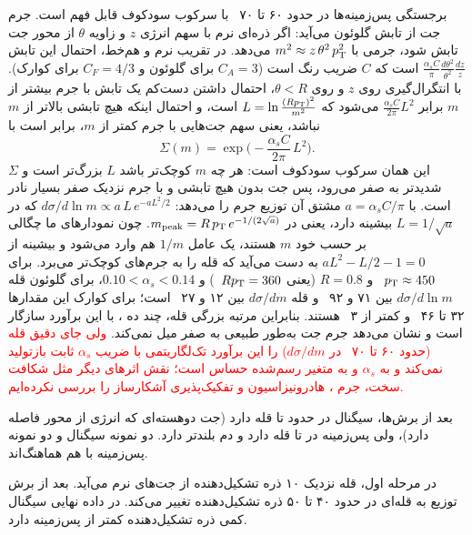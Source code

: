 برجستگی پس‌زمینه‌ها در حدود ۶۰ تا ۷۰~ با سرکوب سودکوف قابل فهم است. جرم جت از تابش گلوئون می‌آید: اگر ذره‌ای نرم با سهم انرژی $z$ و زاویه $\theta$ از محور جت تابش شود، جرمی با $m^2\approx z\,\theta^2\,p_\mathrm{T}^2$ می‌دهد. در تقریب نرم و هم‌خط، احتمال این تابش $\frac{\alpha_s C}{\pi}\frac{d\theta^2}{\theta^2}\frac{dz}{z}$ است که $C$ ضریب رنگ است ($C_A=3$ برای گلوئون و $C_F=4/3$ برای کوارک). با انتگرال‌گیری روی $z$ و روی $\theta<R$، احتمال داشتن دست‌کم یک تابش با جرم بیشتر از $m$ برابر $\frac{\alpha_s C}{2\pi}L^2$ می‌شود که $L=\ln\frac{(Rp_\mathrm{T})^2}{m^2}$ است، و احتمال اینکه هیچ تابشی بالاتر از $m$ نباشد، یعنی سهم جت‌هایی با جرم کمتر از $m$، برابر است با
\[
\Sigma(m)=\exp\!\Big(-\frac{\alpha_s C}{2\pi}\,L^2\Big).
\]
این همان سرکوب سودکوف است: هر چه $m$ کوچک‌تر باشد $L$ بزرگ‌تر است و $\Sigma$ شدیدتر به صفر می‌رود، پس جت بدون هیچ تابشی و با جرم نزدیک صفر بسیار نادر است. با $a=\alpha_s C/\pi$ مشتق آن توزیع جرم را می‌دهد: $d\sigma/d\ln m\propto a\,L\,e^{-aL^2/2}$ که در $L=1/\sqrt{a}$ بیشینه دارد، یعنی در $m_\mathrm{peak}=R\,p_\mathrm{T}\,e^{-1/(2\sqrt{a})}$. چون نمودارهای ما چگالی بر حسب خود $m$ هستند، یک عامل $1/m$ هم وارد می‌شود و بیشینه از $aL^2-L/2-1=0$ به دست می‌آید که قله را به جرم‌های کوچک‌تر می‌برد. برای $p_\mathrm{T}\approx450$~ و $R=0.8$ (یعنی $Rp_\mathrm{T}=360$~) و $0.10<\alpha_s<0.14$، برای گلوئون قله $d\sigma/d\ln m$ بین ۷۱ و ۹۲~ و قله $d\sigma/dm$ بین ۱۲ و ۲۷~ است؛ برای کوارک این مقدارها ۳۲ تا ۴۶~ و کمتر از ۳~ هستند. بنابراین مرتبه بزرگی قله، چند ده ، با این برآورد سازگار است و نشان می‌دهد جرم جت  به‌طور طبیعی به صفر میل نمی‌کند. \textcolor{red}{ولی جای دقیق قله (حدود ۶۰ تا ۷۰~ در $d\sigma/dm$) را این برآورد تک‌لگاریتمی با ضریب $\alpha_s$ ثابت بازتولید نمی‌کند و به $\alpha_s$ و به متغیر رسم‌شده حساس است؛ نقش اثرهای دیگر مثل شکافت سخت، جرم \bq{}، هادرونیزاسیون و تفکیک‌پذیری آشکارساز را بررسی نکرده‌ایم.}

بعد از برش‌ها، سیگنال در  حدود  تا  قله دارد (جت دو‌هسته‌ای که انرژی از محور فاصله دارد)، ولی پس‌زمینه در  تا  قله دارد و دم بلندتر دارد. دو نمونه سیگنال و دو نمونه پس‌زمینه با هم هماهنگ‌اند.

در مرحله اول، قله نزدیک ۱۰ ذره تشکیل‌دهنده از جت‌های نرم می‌آید. بعد از برش  توزیع به قله‌ای در حدود ۴۰ تا ۵۰ ذره تشکیل‌دهنده تغییر می‌کند. در داده نهایی سیگنال کمی ذره تشکیل‌دهنده کمتر از پس‌زمینه دارد.

